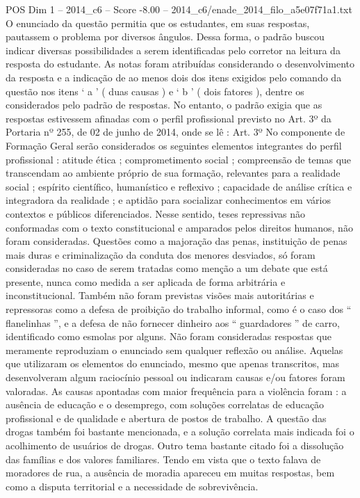 \begin{textsample}{POS Dim 1 – 2014\_c6 – Score -8.00 – 2014\_c6/enade\_2014\_filo\_a5e07f71a1.txt}
O enunciado da questão permitia que os estudantes, em suas respostas, pautassem o problema por diversos ângulos.
Dessa forma, o padrão buscou indicar diversas possibilidades a serem identificadas pelo corretor na leitura da resposta do estudante.
As notas foram atribuídas considerando o desenvolvimento da resposta e a indicação de ao menos dois dos itens exigidos pelo comando da questão nos itens ‘ a ’ ( duas causas ) e ‘ b ’ ( dois fatores ), dentre os considerados pelo padrão de respostas.
No entanto, o padrão exigia que as respostas estivessem afinadas com o perfil profissional previsto no Art. 3º da Portaria nº 255, de 02 de junho de 2014, onde se lê : Art. 3º No componente de Formação Geral serão considerados os seguintes elementos integrantes do perfil profissional : atitude ética ; comprometimento social ; compreensão de temas que transcendam ao ambiente próprio de sua formação, relevantes para a realidade social ; espírito científico, humanístico e reflexivo ; capacidade de análise crítica e integradora da realidade ; e aptidão para socializar conhecimentos em vários contextos e públicos diferenciados.
Nesse sentido, teses repressivas não conformadas com o texto constitucional e amparados pelos direitos humanos, não foram consideradas.
Questões como a majoração das penas, instituição de penas mais duras e criminalização da conduta dos menores desviados, só foram consideradas no caso de serem tratadas como menção a um debate que está presente, nunca como medida a ser aplicada de forma arbitrária e inconstitucional.
Também não foram previstas visões mais autoritárias e repressoras como a defesa de proibição do trabalho informal, como é o caso dos “ flanelinhas ”, e a defesa de não fornecer dinheiro aos “ guardadores ” de carro, identificado como esmolas por alguns.
Não foram consideradas respostas que meramente reproduziam o enunciado sem qualquer reflexão ou análise.
Aquelas que utilizaram os elementos do enunciado, mesmo que apenas transcritos, mas desenvolveram algum raciocínio pessoal ou indicaram causas e/ou fatores foram valoradas.
As causas apontadas com maior frequência para a violência foram : a ausência de educação e o desemprego, com soluções correlatas de educação profissional e de qualidade e abertura de postos de trabalho.
A questão das drogas também foi bastante mencionada, e a solução correlata mais indicada foi o acolhimento de usuários de drogas.
Outro tema bastante citado foi a dissolução das famílias e dos valores familiares.
Tendo em vista que o texto falava de moradores de rua, a ausência de moradia apareceu em muitas respostas, bem como a disputa territorial e a necessidade de sobrevivência.

\end{textsample}
